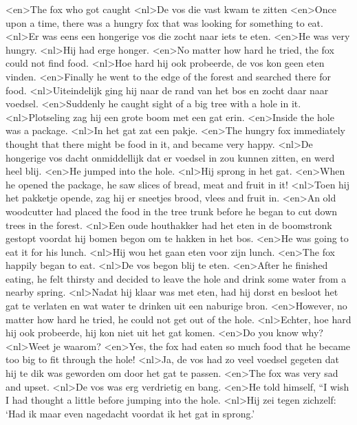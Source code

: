 <en>The fox who got caught
<nl>De vos die vast kwam te zitten
<en>Once upon a time, there was a hungry fox that was looking for something to eat.
<nl>Er was eens een hongerige vos die zocht naar iets te eten.
<en>He was very hungry.
<nl>Hij had erge honger.
<en>No matter how hard he tried, the fox could not find food.
<nl>Hoe hard hij ook probeerde, de vos kon geen eten vinden. 
<en>Finally he went to the edge of the forest and searched there for food.
<nl>Uiteindelijk ging hij naar de rand van het bos en zocht daar naar voedsel.
<en>Suddenly he caught sight of a big tree with a hole in it.
<nl>Plotseling zag hij een grote boom met een gat erin.
<en>Inside the hole was a package.
<nl>In het gat zat een pakje.
<en>The hungry fox immediately thought that there might be food in it, and became very happy.
<nl>De hongerige vos dacht onmiddellijk dat er  voedsel in zou kunnen zitten, en werd heel blij.
<en>He jumped into the hole.
<nl>Hij sprong in het gat. 
<en>When he opened the package, he saw slices of bread, meat and fruit in it! 
<nl>Toen hij het pakketje opende, zag hij er sneetjes brood, vlees and fruit in.
<en>An old woodcutter had placed the food in the tree trunk before he began to cut down trees in the forest.
<nl>Een oude houthakker had het eten in de boomstronk gestopt voordat hij bomen begon om te hakken in het bos. 
<en>He was going to eat it for his lunch.
<nl>Hij wou het gaan eten voor zijn lunch. 
<en>The fox happily began to eat.
<nl>De vos begon blij te eten.
<en>After he finished eating, he felt thirsty and decided to leave the hole and drink some water from a nearby spring.
<nl>Nadat hij klaar was met eten, had hij dorst en besloot het gat te verlaten en wat water te drinken uit een naburige bron. 
<en>However, no matter how hard he tried, he could not get out of the hole.
<nl>Echter, hoe hard hij ook probeerde, hij kon niet uit het gat komen.
<en>Do you know why? 
<nl>Weet je waarom? 
<en>Yes, the fox had eaten so much food that he became too big to fit through the hole!
<nl>Ja, de vos had zo veel voedsel gegeten dat hij te dik was geworden om door het gat te passen.
<en>The fox was very sad and upset.
<nl>De vos was erg verdrietig en bang.
<en>He told himself, “I wish I had thought a little before jumping into the hole.
<nl>Hij zei tegen zichzelf: `Had ik maar even nagedacht voordat ik het gat in sprong.'

